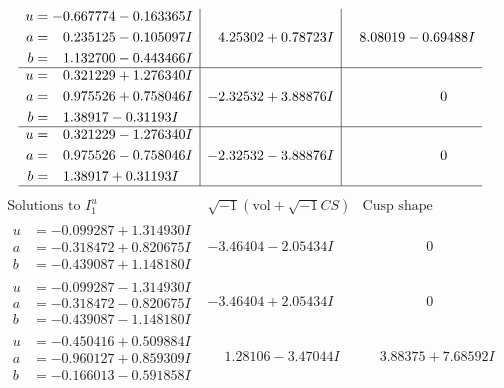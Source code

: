 \documentclass[1p]{elsarticle_modified}
\theoremstyle{definition}
\newcommand{\I}{\sqrt{-1}}
\begin{document}
$$\begin{array}{c|c|c}
\begin{aligned}
u &= -0.667774 - 0.163365 I \\
a &= \phantom{-}0.235125 - 0.105097 I \\
b &= \phantom{-}1.132700 - 0.443466 I\end{aligned}
 & \phantom{-}4.25302 + 0.78723 I & \phantom{-}8.08019 - 0.69488 I \\ \hline\begin{aligned}
u &= \phantom{-}0.321229 + 1.276340 I \\
a &= \phantom{-}0.975526 + 0.758046 I \\
b &= \phantom{-}1.38917 - 0.31193 I\end{aligned}
 & -2.32532 + 3.88876 I & \phantom{-0.000000 } 0 \\ \hline\begin{aligned}
u &= \phantom{-}0.321229 - 1.276340 I \\
a &= \phantom{-}0.975526 - 0.758046 I \\
b &= \phantom{-}1.38917 + 0.31193 I\end{aligned}
 & -2.32532 - 3.88876 I & \phantom{-0.000000 } 0\\
 \hline 
 \end{array}$$\newpage$$\begin{array}{c|c|c}  
\text{Solutions to }I^u_{1}& \I (\text{vol} + \sqrt{-1}CS) & \text{Cusp shape}\\
 \hline 
\begin{aligned}
u &= -0.099287 + 1.314930 I \\
a &= -0.318472 + 0.820675 I \\
b &= -0.439087 + 1.148180 I\end{aligned}
 & -3.46404 - 2.05434 I & \phantom{-0.000000 } 0 \\ \hline\begin{aligned}
u &= -0.099287 - 1.314930 I \\
a &= -0.318472 - 0.820675 I \\
b &= -0.439087 - 1.148180 I\end{aligned}
 & -3.46404 + 2.05434 I & \phantom{-0.000000 } 0 \\ \hline\begin{aligned}
u &= -0.450416 + 0.509884 I \\
a &= -0.960127 + 0.859309 I \\
b &= -0.166013 - 0.591858 I\end{aligned}
 & \phantom{-}1.28106 - 3.47044 I & \phantom{-}3.88375 + 7.68592 I \\ \hline\begin{aligned}

\end{aligned}
\end{array}$$
\end{document}
